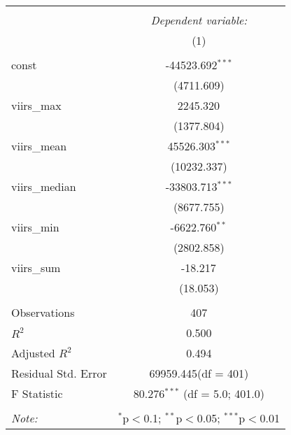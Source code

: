\begin{table}[!htbp] \centering
\begin{tabular}{@{\extracolsep{5pt}}lc}
\\[-1.8ex]\hline
\hline \\[-1.8ex]
& \multicolumn{1}{c}{\textit{Dependent variable:}} \
\cr \cline{1-2}
\\[-1.8ex] & (1) \\
\hline \\[-1.8ex]
 const & -44523.692$^{***}$ \\
  & (4711.609) \\
 viirs_max & 2245.320$^{}$ \\
  & (1377.804) \\
 viirs_mean & 45526.303$^{***}$ \\
  & (10232.337) \\
 viirs_median & -33803.713$^{***}$ \\
  & (8677.755) \\
 viirs_min & -6622.760$^{**}$ \\
  & (2802.858) \\
 viirs_sum & -18.217$^{}$ \\
  & (18.053) \\
\hline \\[-1.8ex]
 Observations & 407 \\
 $R^2$ & 0.500 \\
 Adjusted $R^2$ & 0.494 \\
 Residual Std. Error & 69959.445(df = 401)  \\
 F Statistic & 80.276$^{***}$ (df = 5.0; 401.0) \\
\hline
\hline \\[-1.8ex]
\textit{Note:} & \multicolumn{1}{r}{$^{*}$p$<$0.1; $^{**}$p$<$0.05; $^{***}$p$<$0.01} \\
\end{tabular}
\end{table}